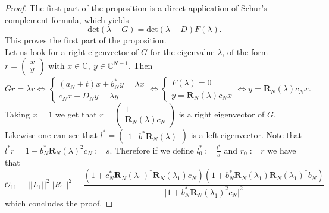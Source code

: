 \documentclass[12pt,a4paper]{amsart}
\theoremstyle{plain} %
\newcommand{\C}{\mathbb{C}}
\newcommand{\Ov}{\mathscr{O}}
\newcommand{\la}{\lambda}
\begin{document}
\begin{proof}
     The first part of the proposition is a direct application of Schur's complement formula, which yields
    \begin{equation*}
        \mathrm{det}(\lambda-G)=\mathrm{det}(\lambda-D)F(\lambda).
    \end{equation*}
    This proves the first part of the proposition. 
    \\
    Let us look for a right eigenvector of $G$ for the eigenvalue $\la$, of the form 
    $r=\begin{pmatrix}
        x\\y
    \end{pmatrix}$
    with $x\in \C, \ y\in \C^{N-1}$.
    Then
    \begin{equation*}      
            Gr=\lambda r 
        \Longleftrightarrow
        \begin{cases}
            (a_N+t)x+b_N^*y=\lambda x \\
            c_Nx+D_Ny=\lambda y
        \end{cases}
        \Longleftrightarrow
        \begin{cases}
            F(\lambda)=0\\
            y=\mathbf{R}_{N}(\la)c_Nx
        \end{cases}
        \Longleftrightarrow
        y=\mathbf{R}_{N}(\la)c_Nx.
    \end{equation*}
    Taking $x=1$ we get that $r=\begin{pmatrix}
        1\\
        \mathbf{R}_{N}(\la)c_N
    \end{pmatrix}$
    is a right eigenvector of $G$. Likewise one can see that $l^*=\begin{pmatrix}
        1 & b^*\mathbf{R}_{N}(\la)
    \end{pmatrix}$
    is a left eigenvector. Note that $l^*r=1+b_N^*\mathbf{R}_{N}(\la)^2c_N:=s$. 
    Therefore if we define $l_0^*:=\frac{l^*}{s}$ and $r_0:=r$ we have that 
    \begin{equation*}
         \Ov_{11} = \lvert \lvert L_1 \lvert \lvert^2 \lvert \lvert R_1 \lvert \lvert^2 
         =\frac{(1+c_N^*\mathbf{R}_{N}(\la_1)^*\mathbf{R}_{N}(\la_1)c_N)(1+b_N^*\mathbf{R}_{N}(\la_1)\mathbf{R}_{N}(\la_1)^*b_N)}{\lvert 1 +b_N^*\mathbf{R}_{N}(\la_1)^2c_N\lvert^2}
    \end{equation*}
    which concludes the proof.
 \end{proof}
\end{document}
